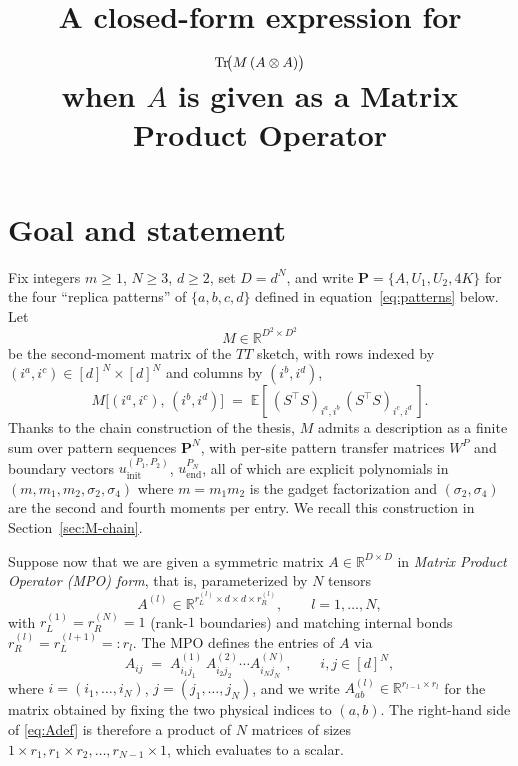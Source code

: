 \documentclass[11pt]{article}
\title{A closed-form expression for $\operatorname{Tr}\!\bigl(M\,(A\otimes A)\bigr)$\\
when $A$ is given as a Matrix Product Operator}
\author{}
\date{}
\newcommand{\IR}{\mathbb{R}}
\newcommand{\IE}{\mathbb{E}}
\newcommand{\bP}{\boldsymbol{P}}
\begin{document}
\maketitle

\section{Goal and statement}

Fix integers $m \ge 1$, $N \ge 3$, $d \ge 2$, set $D = d^N$, and write
$\bP = \{A, U_1, U_2, 4K\}$ for the four ``replica patterns'' of
$\{a,b,c,d\}$ defined in equation~\eqref{eq:patterns} below. Let
\[
M \in \IR^{D^2 \times D^2}
\]
be the second-moment matrix of the $TT$ sketch, with rows indexed by
$(i^a, i^c) \in [d]^N \times [d]^N$ and columns by $(i^b, i^d)$,
\begin{equation}\label{eq:Mdef}
M\bigl[(i^a,i^c),\,(i^b,i^d)\bigr] \;=\;
\IE\!\left[\,(S^\top S)_{i^a,i^b}\,(S^\top S)_{i^c,i^d}\,\right].
\end{equation}
Thanks to the chain construction of the thesis, $M$ admits a description
as a finite sum over pattern sequences $\bP^N$, with per-site pattern
transfer matrices $W^P$ and boundary vectors $u_{\text{init}}^{(P_1,P_2)}$,
$u_{\text{end}}^{P_N}$, all of which are explicit polynomials in
$(m, m_1, m_2, \sigma_2, \sigma_4)$ where $m=m_1m_2$ is the gadget
factorization and $(\sigma_2,\sigma_4)$ are the second and fourth moments
per entry. We recall this construction in
Section~\ref{sec:M-chain}.

Suppose now that we are given a symmetric matrix
$A \in \IR^{D \times D}$ in \emph{Matrix Product Operator (MPO) form},
that is, parameterized by $N$ tensors
\[
A^{(l)} \in \IR^{r_L^{(l)} \times d \times d \times r_R^{(l)}}, \qquad l=1,\dots,N,
\]
with $r_L^{(1)} = r_R^{(N)} = 1$ (rank-$1$ boundaries) and matching internal
bonds $r_R^{(l)} = r_L^{(l+1)} =: r_l$. The MPO defines the entries of $A$ via
\begin{equation}\label{eq:Adef}
A_{ij} \;=\; A^{(1)}_{i_1 j_1}\,A^{(2)}_{i_2 j_2} \cdots A^{(N)}_{i_N j_N},
\qquad i,j\in[d]^N,
\end{equation}
where $i = (i_1,\dots,i_N)$, $j = (j_1,\dots,j_N)$, and we write
$A^{(l)}_{ab} \in \IR^{r_{l-1} \times r_l}$ for the matrix obtained by
fixing the two physical indices to $(a,b)$. The right-hand side of
\eqref{eq:Adef} is therefore a product of $N$ matrices of sizes
$1\times r_1, r_1\times r_2,\dots, r_{N-1}\times 1$, which evaluates to a
scalar.

\medskip
\end{document}
